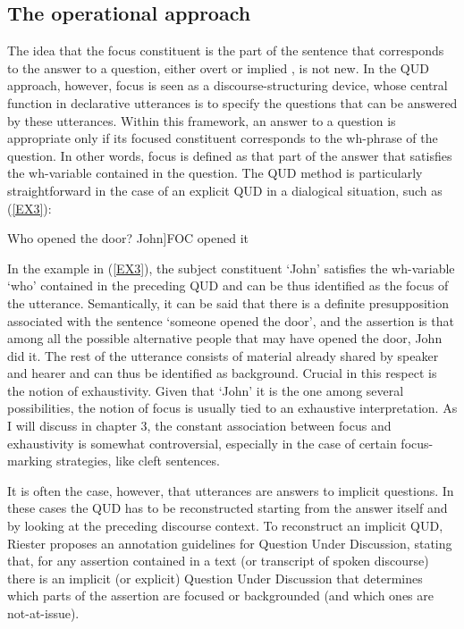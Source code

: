 \documentclass[12pt]{report}
\begin{document}
\subsection{The operational approach}\label{operationalapproaches}

The idea that the focus constituent is the part of the sentence that corresponds to the answer to a question, either overt or implied \cite{bresnan1989locative}, is not new. In the QUD approach, however,  focus  is seen as a discourse-structuring device, whose central function in declarative utterances is to specify the questions that can be answered by these utterances. Within this framework, an answer to a question is appropriate only if its focused constituent corresponds to the wh-phrase of the question. In other words, focus is defined as that part of the answer that satisfies the wh-variable contained in the question. The QUD method is particularly straightforward in the case of an explicit QUD in a dialogical situation, such as (\ref{EX3}):

\pex \label{EX3}
\a Who opened the door?
\vspace{-0.3cm}
\a {[}John{]}\tiny{FOC} \normalsize opened it
\xe

\noindent
In the example in (\ref{EX3}), the subject constituent ‘John' satisfies the wh-variable ‘who' contained in the preceding QUD and can be thus identified as the focus of the utterance. Semantically, it can be said that there  is a definite presupposition associated with the sentence ‘someone opened the door’, and the assertion is that among all the possible alternative people that may have opened the door, John did it. The rest of the utterance consists of material already shared by speaker and hearer and can thus be identified as background. Crucial in this respect is the notion of exhaustivity. Given that ‘John' it is the one among several possibilities, the notion of focus is usually tied to an exhaustive interpretation. As I will discuss in chapter 3, the constant association between focus and exhaustivity is somewhat controversial, especially in the case of certain focus-marking strategies, like cleft sentences.

It is often the case, however, that utterances are answers to implicit questions. In these cases the QUD has to be reconstructed starting from the answer itself and by looking at the preceding discourse context.
To reconstruct an implicit QUD, Riester \cite{riester2018annotation} proposes an annotation guidelines for Question Under Discussion, stating that, for any assertion contained in a text (or transcript of spoken discourse) there is an implicit (or explicit) Question Under Discussion that determines which parts of the assertion are focused or backgrounded (and which ones are not-at-issue). 
\end{document}
